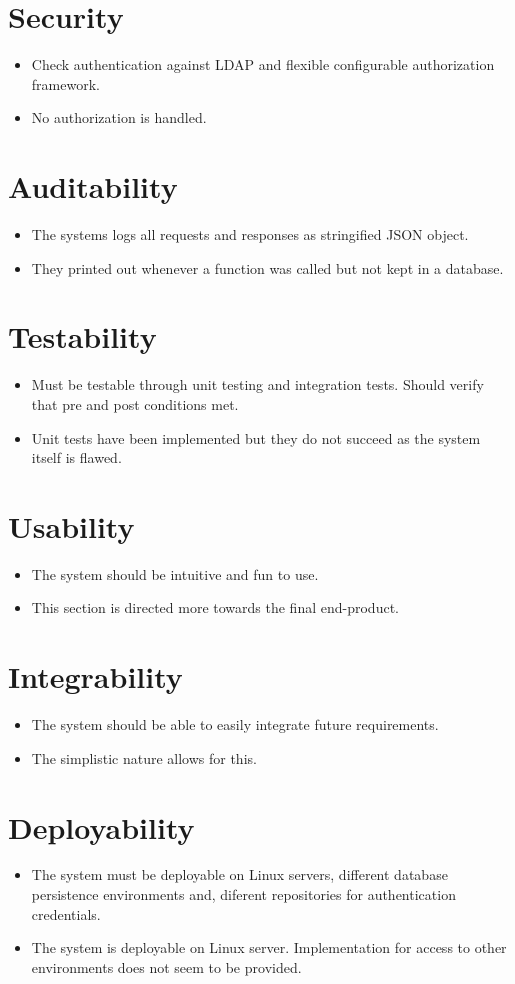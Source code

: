 \section{Security}
	\begin{itemize}
		\item Check authentication against LDAP and flexible configurable authorization framework.
		\item No authorization is handled.
	\end{itemize}
\section{Auditability}
	\begin{itemize}
		\item The systems logs all requests and responses as stringified JSON object.
		\item They printed out whenever a function was called but not kept in a database.
	\end{itemize}
\section{Testability}
	\begin{itemize}
		\item Must be testable through unit testing and integration tests. Should verify that pre and post conditions met.
		\item Unit tests have been implemented but they do not succeed as the system itself is flawed.
	\end{itemize}
\section{Usability}
	\begin{itemize}
		\item The system should be intuitive and fun to use.
		\item This section is directed more towards the final end-product.
	\end{itemize}
\section{Integrability}
	\begin{itemize}
		\item The system should be able to easily integrate future requirements.
		\item The simplistic nature allows for this.
	\end{itemize}
\section{Deployability}
	\begin{itemize}
		\item The system must be deployable on Linux servers, different database persistence environments and, diferent repositories for authentication credentials.
		\item The system is deployable on Linux server. Implementation for access to other environments does not seem to be provided.
	\end{itemize}
